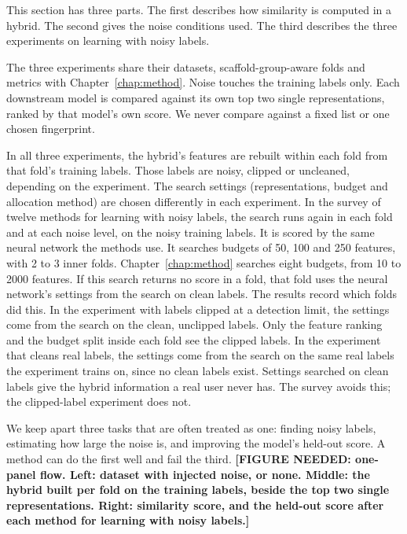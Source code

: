 This section has three parts. The first describes how similarity is computed in a hybrid. The second gives the noise conditions used. The third describes the three experiments on learning with noisy labels.

The three experiments share their datasets, scaffold-group-aware folds and metrics with Chapter~\ref{chap:method}. Noise touches the training labels only. Each downstream model is compared against its own top two single representations, ranked by that model's own score. We never compare against a fixed list or one chosen fingerprint.

In all three experiments, the hybrid's features are rebuilt within each fold from that fold's training labels. Those labels are noisy, clipped or uncleaned, depending on the experiment. The search settings (representations, budget and allocation method) are chosen differently in each experiment. In the survey of twelve methods for learning with noisy labels, the search runs again in each fold and at each noise level, on the noisy training labels. It is scored by the same neural network the methods use. It searches budgets of 50, 100 and 250 features, with 2 to 3 inner folds. Chapter~\ref{chap:method} searches eight budgets, from 10 to 2000 features. If this search returns no score in a fold, that fold uses the neural network's settings from the search on clean labels. The results record which folds did this. In the experiment with labels clipped at a detection limit, the settings come from the search on the clean, unclipped labels. Only the feature ranking and the budget split inside each fold see the clipped labels. In the experiment that cleans real labels, the settings come from the search on the same real labels the experiment trains on, since no clean labels exist. Settings searched on clean labels give the hybrid information a real user never has. The survey avoids this; the clipped-label experiment does not.

We keep apart three tasks that are often treated as one: finding noisy labels, estimating how large the noise is, and improving the model's held-out score. A method can do the first well and fail the third. \textbf{[FIGURE NEEDED: one-panel flow. Left: dataset with injected noise, or none. Middle: the hybrid built per fold on the training labels, beside the top two single representations. Right: similarity score, and the held-out score after each method for learning with noisy labels.]}



